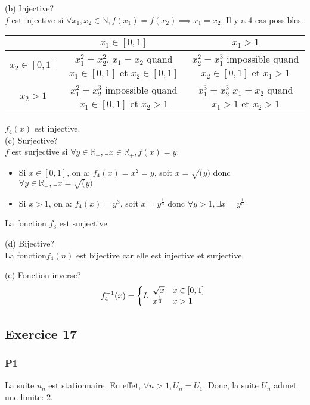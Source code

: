 \documentclass[]{book}
\theoremstyle{definition}
\begin{document}
(b) Injective?\\
$f$ est injective si $\forall x_1, x_2 \in \mathbb{N}, f(x_1) = f(x_2) \implies x_1 = x_2$. Il y a 4 cas possibles.

\begin{center}
\begin{tabular}{c|c|c} 
                 & $x_1 \in [0,1]$ & $x_1 > 1$ \\
      \hline
     $x_2 \in [0,1]$ & $x_1^2 = x_2^2$,  $x_1=x_2$ quand $x_1 \in [0,1]$ et $x_2 \in [0,1]$ &  $x_2^2 = x_1^3$ impossible quand $x_2 \in [0,1]$ et $x_1 >1 $ \\ 
      \hline
     $x_2 > 1$ & $x_1^2 = x_2^3$ impossible quand $x_1 \in [0,1]$ et $x_2 >1 $ & $x_1^3 = x_2^3$ $x_1=x_2$ quand $x_1 > 1$ et $x_2 >1 $\\
\end{tabular}
\end{center}
$f_4(x)$ est injective.\\



(c) Surjective?\\
$f$ est surjective si $\forall y \in \mathbb{R}_{+}, \exists x \in \mathbb{R}_{+}, f(x) = y$.\\
\begin{itemize}
\item Si $x \in [0,1]$, on a: 
$ f_4(x) = x^2 = y$, soit $x=\sqrt(y)$ donc $\forall y \in \mathbb{R}_{+}, \exists x = \sqrt(y)$
\item Si $x > 1$, on a:
$ f_4(x) = y^3$, soit $x= y^{\frac{1}{3}}$ donc $\forall y >1, \exists x = y^{\frac{1}{3}}$
\end{itemize}
La fonction $f_3$ est surjective.

(d) Bijective?\\
La fonction$f_4(n)$ est bijective car elle est injective et surjective.

(e) Fonction inverse?\\
$$f_4^{-1}(x) = 
\left\{L
\begin{array}{l l}
 \sqrt{x} & x \in [0,1] \\
 x^{\frac{1}{3}} & x > 1\\
\end{array}
\right. 
$$

\subsection*{Exercice 17}
\subsubsection*{P1}
La suite $u_n$ est stationnaire. En effet, $\forall n > 1, U_n = U_1$. Donc, la suite $U_n$ admet une limite: $2$.
\end{document}
